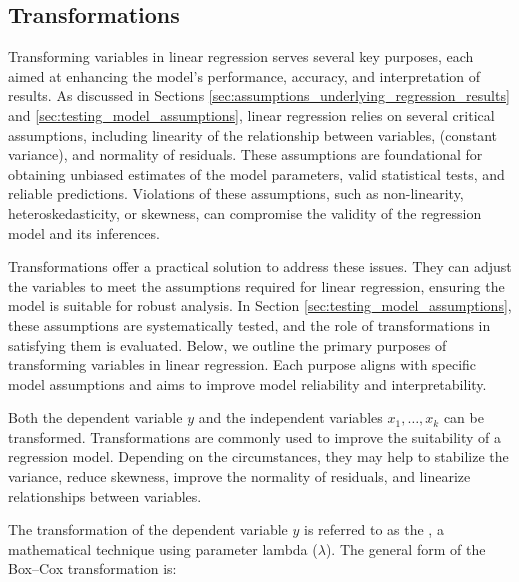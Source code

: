 
\subsection{Transformations} %
\label{sub:transformations}

Transforming variables in linear regression serves several key purposes, each aimed at enhancing the model's performance, accuracy, and interpretation of results. As discussed in Sections \ref{sec:assumptions_underlying_regression_results} and \ref{sec:testing_model_assumptions}, linear regression relies on several critical assumptions, including linearity of the relationship between variables,  (constant variance), and normality of residuals. These assumptions are foundational for obtaining unbiased estimates of the model parameters, valid statistical tests, and reliable predictions. Violations of these assumptions, such as non-linearity, heteroskedasticity, or skewness, can compromise the validity of the regression model and its inferences.

Transformations offer a practical solution to address these issues. They can adjust the variables to meet the assumptions required for linear regression, ensuring the model is suitable for robust analysis. In Section \ref{sec:testing_model_assumptions}, these assumptions are systematically tested, and the role of transformations in satisfying them is evaluated. Below, we outline the primary purposes of transforming variables in linear regression. Each purpose aligns with specific model assumptions and aims to improve model reliability and interpretability.

\bigskip

Both the dependent variable \(y\) and the independent variables \(x_1,\ldots,x_k\) can be transformed. Transformations are commonly used to improve the suitability of a regression model. Depending on the circumstances, they may help to stabilize the variance, reduce skewness, improve the normality of residuals, and linearize relationships between variables.

\bigskip

The transformation of the dependent variable \(y\) is referred to as the , a mathematical technique using parameter lambda (\(\lambda\)). The general form of the Box--Cox transformation is:


